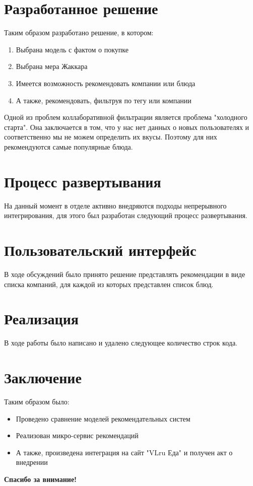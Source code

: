\documentclass{fefu}
\begin{document}
  \section{Разработанное решение}
  Таким образом разработано решение, в котором:
  \begin{enumerate}
    \item Выбрана модель с фактом о покупке
    \item Выбрана мера Жаккара
    \item Имеется возможность рекомендовать компании или блюда
    \item А также, рекомендовать, фильтруя по тегу или компании
  \end{enumerate}
  Одной из проблем коллаборативной фильтрации является проблема "холодного старта".
  Она заключается в том, что у нас нет данных о новых пользователях и соответственно
  мы не можем определить их вкусы. Поэтому для них рекомендуются самые популярные блюда.

  \section{Процесс развертывания}
  На данный момент в отделе активно внедряются подходы непрерывного интегрирования,
  для этого был разработан следующий процесс развертывания.

  \section{Пользовательский интерфейс}
  В ходе обсуждений было принято решение представлять рекомендации в виде списка
  компаний, для каждой из которых представлен список блюд.

  \section{Реализация}
  В ходе работы было написано и удалено следующее количество строк кода.

  \section{Заключение}
  Таким образом было:
  \begin{itemize}
    \item Проведено сравнение моделей рекомендательных систем
    \item Реализован микро-сервис рекомендаций
    \item А также, произведена интеграция на сайт "VLru Еда" и получен акт о внедрении
  \end{itemize}

  \textbf{Спасибо за внимание!}
\end{document}

